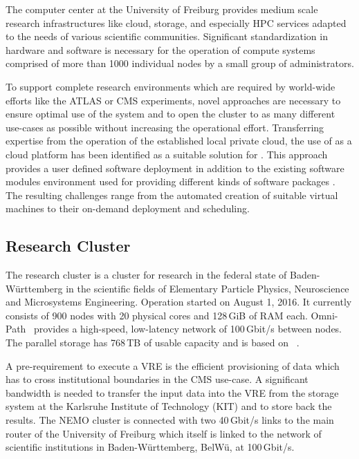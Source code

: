 The computer center at the University of Freiburg provides
medium scale research
infrastructures like cloud, storage, and especially HPC services adapted to the
needs of various scientific communities. Significant standardization
in hardware and software is necessary for the operation of compute systems comprised of
more than 1000 individual nodes by a small group of administrators.

To support complete research environments which are required by world-wide efforts like the
ATLAS or CMS experiments, novel approaches are necessary to ensure optimal use of the system
and to open the cluster to as many different use-cases as
possible without increasing the operational effort.
Transferring expertise from the operation of the established local
private cloud, 
the use of \Openstack as a cloud platform has been identified
as a
suitable solution for \NEMO. This approach provides a user defined software
deployment in addition to the existing software  modules environment used for
providing different kinds of software packages \cite{online:modules}.
The resulting challenges range from the automated creation of suitable
virtual machines to their on-demand deployment and scheduling.

\subsection{Research Cluster \NEMO}

The research cluster \NEMO is a cluster for 
research in the federal state of Baden-W\"urttemberg in the scientific fields of Elementary Particle Physics, Neuroscience and
Microsystems Engineering. Operation started on  August 1, 2016.
It currently consists of 900 nodes with 20 physical cores and 128\,GiB of RAM each.
Omni-Path~\cite{Omnipath} provides a high-speed, low-latency network of 100\,Gbit/s between nodes.
The parallel storage has
768\,TB of usable capacity and is based on \BeeGFS~\cite{BeeGFS}.


A pre-requirement to execute a VRE is the efficient
provisioning of data which has to cross institutional boundaries in the CMS use-case.
A significant bandwidth is needed to transfer the input data into the VRE from the storage system at
the Karlsruhe Institute of Technology (KIT) and to store back the results. The
NEMO cluster is connected with two 40\,Gbit/s links to the main router of the
University of Freiburg which itself is linked to the network of
scientific institutions in Baden-W\"urttemberg, BelW\"u, at
100\,Gbit/s.

